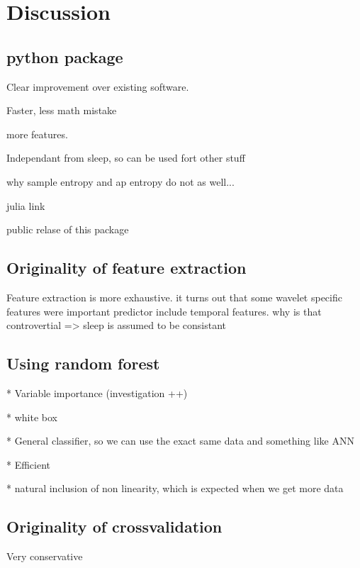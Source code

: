 \section{Discussion} \label{discussion}

\subsection{python package} 
Clear improvement over existing software.

Faster, less math mistake

more features.

Independant from sleep, so can be used fort other stuff

why sample entropy and ap entropy do not as well...

julia link

public relase of this package


\subsection{Originality of feature extraction} 
Feature extraction is more exhaustive.
it turns out that some wavelet specific features were  important predictor
include temporal features.
why is that controvertial => sleep is assumed to be consistant

\subsection{Using random forest} 

* Variable importance (investigation ++)

* white box

* General classifier, so we can use the exact same data and something like ANN

* Efficient

* natural inclusion of non linearity, which is expected when we get more data

\subsection{Originality of crossvalidation} 

Very conservative





